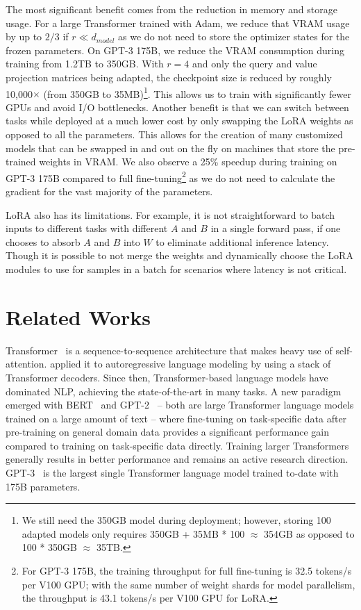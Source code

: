 The most significant benefit comes from the reduction in memory and storage usage.
For a large Transformer trained with Adam, we reduce that VRAM usage by up to $2/3$ if $r\ll d_{model}$ as we do not need to store the optimizer states for the frozen parameters.
On GPT-3 175B, we reduce the VRAM consumption during training from 1.2TB to 350GB.
With $r=4$ and only the query and value projection matrices being adapted, the checkpoint size is reduced by roughly 10,000$\times$ (from 350GB to 35MB)\footnote{We still need the 350GB model during deployment; however, storing 100 adapted models only requires 350GB + 35MB * 100 $\approx$ 354GB as opposed to 100 * 350GB $\approx$ 35TB.}.
This allows us to train with significantly fewer GPUs and avoid I/O bottlenecks.
Another benefit is that we can switch between tasks while deployed at a much lower cost by only swapping the LoRA weights as opposed to all the parameters.
This allows for the creation of many customized models that can be swapped in and out on the fly on machines that store the pre-trained weights in VRAM.
We also observe a 25\% speedup during training on GPT-3 175B compared to full fine-tuning\footnote{For GPT-3 175B, the training throughput for full fine-tuning is 32.5 tokens/s per V100 GPU; with the same number of weight shards for model parallelism, the throughput is 43.1 tokens/s per V100 GPU for LoRA.} as we do not need to calculate the gradient for the vast majority of the parameters.

LoRA also has its limitations.
For example, it is not straightforward to batch inputs to different tasks with different $A$ and $B$ in a single forward pass, if one chooses to absorb $A$ and $B$ into $W$ to eliminate additional inference latency.
Though it is possible to not merge the weights and dynamically choose the LoRA modules to use for samples in a batch for scenarios where latency is not critical.





\section{Related Works}
\label{sec:related_works}

Transformer~\citep{vaswani2017attention} is a sequence-to-sequence architecture that makes heavy use of self-attention.
\citet{radford_improving_nodate} applied it to autoregressive language modeling by using a stack of Transformer decoders.
Since then, Transformer-based language models have dominated NLP, achieving the state-of-the-art in many tasks.
A new paradigm emerged with BERT~\citep{devlin_bert_2019} and GPT-2~\citep{radford_language_nodate} -- both are large Transformer language models trained on a large amount of text -- where fine-tuning on task-specific data after pre-training on general domain data provides a significant performance gain compared to training on task-specific data directly.
Training larger Transformers generally results in better performance and remains an active research direction.
GPT-3~\citep{brown_language_2020} is the largest single Transformer language model trained to-date with 175B parameters.


